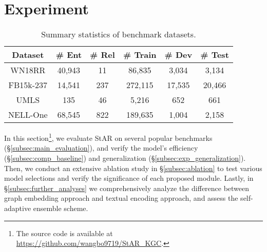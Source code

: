 \documentclass[sigconf]{acmart}
\begin{document}
\section{Experiment} \label{sec:exp}

\begin{table}[t]\small
\caption{\small Summary statistics of benchmark datasets.}
\renewcommand\tabcolsep{4.0pt}
	\centering
	\begin{tabular}{c|ccccc}
		\hline
		\textbf{Dataset}   & \textbf{\# Ent}  & \textbf{\# Rel} & \textbf{\# Train} & \textbf{\# Dev} & \textbf{\# Test} \\ \hline
		WN18RR    & 40,943  & 11    & 86,835   & 3,034  & 3,134   \\
		FB15k-237 & 14,541  & 237   & 272,115  & 17,535 & 20,466  \\ 
		UMLS      & 135    & 46    & 5,216    & 652   & 661    \\ \hline
		NELL-One  & 68,545  & 822   & 189,635  & 1,004  & 2,158 \\\hline
	\end{tabular}
	\label{tb:benchmark_stat}
\end{table}

In this section\footnote{The source code is available at \url{https://github.com/wangbo9719/StAR_KGC}.}, we evaluate StAR on several popular benchmarks (\S \ref{subsec:main_evaluation}), and verify the model's efficiency (\S \ref{subsec:comp_baseline}) and generalization (\S \ref{subsec:exp_generalization}). 
Then, we conduct an extensive ablation study in \S \ref{subsec:ablation} to test various model selections and verify the significance of each proposed module. 
Lastly, in \S \ref{subsec:further_analyses} we comprehensively analyze the difference between graph embedding approach and textual encoding approach, and assess the self-adaptive ensemble scheme.
\end{document}
